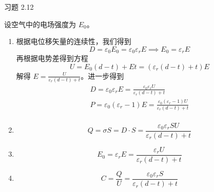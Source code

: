 \begin{problem}
	习题 2.12
	\begin{solution}
		设空气中的电场强度为 $E_0$。
		\begin{enumerate}
			\item[\textbf{1)}] 根据电位移矢量的连续性，我们得到
			$$
			D = \varepsilon_0 E_0 = \varepsilon_0 \varepsilon_r E \implies E_0 = \varepsilon_r E
			$$
			再根据电势差得到方程
			$$
			U = E_0 (d - t) + E t = (\varepsilon_r (d - t) + t) E
			$$
			解得 $E = \frac{U}{\varepsilon_r(d - t) + t}$。进一步得到
			$$
			\begin{gathered}
				D = \varepsilon_0 \varepsilon_r E = \frac{\varepsilon_0 \varepsilon_r U}{\varepsilon_r (d - t) + t} \\
				P = \varepsilon_0 (\varepsilon_r - 1) E = \frac{\varepsilon_0 (\varepsilon_r - 1) U}{\varepsilon_r (d - t) + t} \\
			\end{gathered}
			$$

			\item[\textbf{2)}]
			$$
			Q = \sigma S = D \cdot S = \frac{\varepsilon_0 \varepsilon_r S U}{\varepsilon_r (d - t) + t}
			$$

			\item[\textbf{3)}]
			$$
			E_0 = \varepsilon_r E = \frac{\varepsilon_r U}{\varepsilon_r(d - t) + t}
			$$

			\item[\textbf{4)}]
			$$
			C = \frac{Q}{U} = \frac{\varepsilon_0 \varepsilon_r S}{\varepsilon_r (d - t) + t}
			$$
		\end{enumerate}
	\end{solution}
\end{problem}


